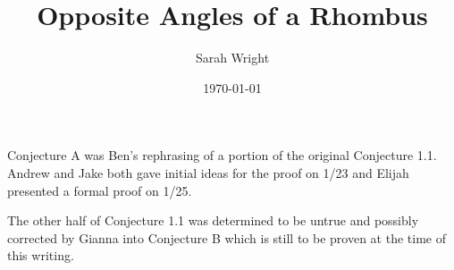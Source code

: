 \usepackage{wasysym} %

\title{Opposite Angles of a Rhombus}

\author{Sarah Wright}

\date{\today}



\maketitle



Conjecture A was Ben's rephrasing of a portion of the original Conjecture 1.1.  Andrew and Jake both gave initial ideas for the proof on 1/23 and Elijah presented a formal proof on 1/25.  

The other half of Conjecture 1.1 was determined to be untrue and possibly corrected by Gianna into Conjecture B which is still to be proven at the time of this writing.

\setcounter{section}{1}
\setcounter{theorem}{1}


